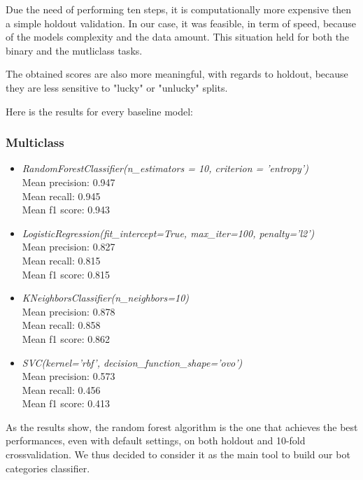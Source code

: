 Due the need of performing ten steps, it is computationally more expensive then a simple holdout validation. In our case, it was feasible, in term of speed, because of the models complexity and the data amount. This situation held for both the binary and the mutliclass tasks.

The obtained scores are also more meaningful, with regards to holdout, because they are less sensitive to "lucky" or "unlucky" splits.

Here is the results for every baseline model:
\subsubsection{Multiclass}
\begin{itemize}
	\item[\PencilRight] \textit{RandomForestClassifier(n\_estimators = 10, criterion = 'entropy')}\\
	Mean precision: 0.947\\
	Mean recall: 0.945\\
	Mean f1 score: 0.943
	\item[\PencilRight]\textit{LogisticRegression(fit\_intercept=True, max\_iter=100, penalty='l2')}\\
	Mean precision: 0.827\\
	Mean recall: 0.815\\
	Mean f1 score: 0.815
	\item[\PencilRight]\textit{KNeighborsClassifier(n\_neighbors=10)}\\
	Mean precision: 0.878\\
	Mean recall: 0.858\\
	Mean f1 score: 0.862
	\item[\PencilRight]\textit{SVC(kernel='rbf', decision\_function\_shape='ovo')}\\
	Mean precision: 0.573\\
	Mean recall: 0.456\\
	Mean f1 score: 0.413
\end{itemize}

As the results show, the random forest algorithm is the one that achieves the best performances, even with default settings, on both holdout and 10-fold crossvalidation. We thus decided to consider it as the main tool to build our bot categories classifier. 
